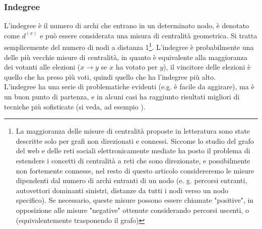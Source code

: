 \subsubsection{Indegree}
L'indegree è il numero di archi che entrano in un determinato nodo, è denotato come $d^{(x)}$ e può essere considerata una misura di centralità geometrica. Si tratta semplicemente del numero di nodi a distanza 1\footnote{La maggioranza delle misure di centralità proposte in letteratura sono state descritte solo per grafi non direzionati e connessi. Siccome lo studio del grafo del web e delle reti sociali elettronicamente mediate ha posto il problema di estendere i concetti di centralità a reti che sono direzionate, e possibilmente non fortemente connesse, nel resto di questo articolo considereremo le misure dipendenti dal numero di archi entranti di un nodo (e. g. percorsi entranti, autovettori dominanti sinistri, distanze da tutti i nodi verso un nodo specifico). Se necessario, queste misure possono essere chiamate "positive", in opposizione alle misure "negative" ottenute considerando percorsi uscenti, o (equivalentemente trasponendo il grafo)}. L'indegree è probabilmente una delle più vecchie misure di centralità, in quanto è equivalente alla maggioranza dei votanti alle elezioni ($x \rightarrow y$ se $x$ ha votato per $y$), il vincitore delle elezioni è quello che ha preso più voti, quindi quello che ha l'indegree più alto.\\
L'indegree ha una serie di problematiche evidenti (e.g. è facile da aggirare), ma è un buon punto di partenza, e in alcuni casi ha raggiunto risultati migliori di tecniche più sofisticate (si veda, ad esempio %
).
